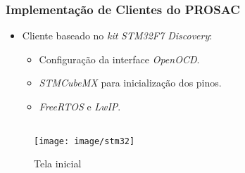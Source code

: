 \begin{frame}
\frametitle {Implementação de Clientes do PROSAC}

\begin{itemize}
  \item Cliente baseado no \textit{kit} \textit{STM32F7 Discovery}:	
  
  \begin{itemize} 
  \item Configuração da interface \textit{OpenOCD}.
  \item \textit{STMCubeMX} para inicialização dos pinos.
  \item \textit{FreeRTOS} e \textit{LwIP}.
  \end{itemize}
\end{itemize}

\begin{columns}
\begin{column}{0.49\textwidth}
	\begin{figure}
	\centering
	\vspace{-10pt}
	\texttt{[image: image/stm32]}
	\label{fig:1}
	\caption{Tela inicial}
	\end{figure}
\end{column}
\begin{column}{0.49\textwidth}
	\begin{figure}
	\centering

\end{figure}
\end{column}
\end{columns}
\end{frame}
